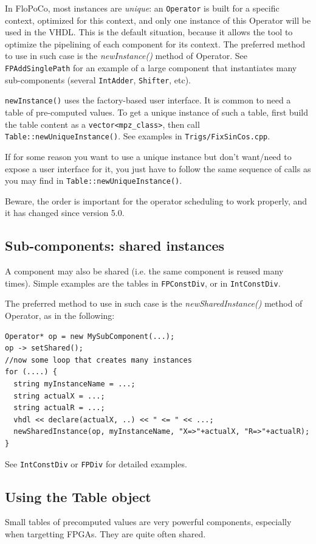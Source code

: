 \documentclass{article}
\begin{document}
In FloPoCo, most instances are \emph{unique}: an \texttt{Operator} is built for a specific context, optimized for this context, and only one instance of this Operator will be used in the VHDL.
This is the default situation, because it allows the tool to optimize the pipelining of each component for its context.
The preferred method to use in such case is the \emph{newInstance()} method of Operator. 
See \texttt{FPAddSinglePath} for an example of a large component that instantiates many sub-components (several \texttt{IntAdder}, \texttt{Shifter}, etc).

\texttt{newInstance()} uses the factory-based user interface.
It is common to need a table of pre-computed values.
To get a unique instance of such a table,  first build the table content as a \verb!vector<mpz_class>!, then call \texttt{Table::newUniqueInstance()}.
See examples in \texttt{Trigs/FixSinCos.cpp}.


If for some reason you want to use a unique instance but don't want/need to expose a user interface for it, you just have to follow the same sequence of calls as you may find in \texttt{Table::newUniqueInstance()}.

Beware, the order is important for the operator scheduling to work properly, and it has changed since version 5.0.

\subsection{Sub-components: shared instances}

A component may also be shared (i.e. the same component is reused many times).
Simple examples are the tables in \texttt{FPConstDiv}, or in \texttt{IntConstDiv}.

The preferred method to use in such case is the \emph{newSharedInstance()} method of Operator, as in the following:
\begin{verbatim}
Operator* op = new MySubComponent(...);
op -> setShared();
//now some loop that creates many instances
for (....) {
  string myInstanceName = ...; 
  string actualX = ...;
  string actualR = ...;
  vhdl << declare(actualX, ..) << " <= " << ...;   
  newSharedInstance(op, myInstanceName, "X=>"+actualX, "R=>"+actualR);
}
\end{verbatim}

See \texttt{IntConstDiv} or \texttt{FPDiv} for detailed examples.

\subsection{Using the Table object}
Small tables of precomputed values are very powerful components, especially when targetting FPGAs.
They are quite often shared.
\end{document}
